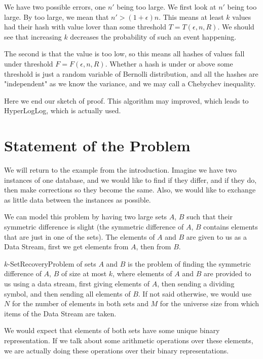 We have two possible errors, one $n'$ being too large. We first look at $n'$ being too large. By too large, we mean that $n' > (1 + \epsilon) n$. This means at least $k$ values had their hash with value lover than some threshold $T = T(\epsilon, n, R)$. We should see that increasing $k$ decreases the probability of such an event happening. 

The second is that the value is too low, so this means all hashes of values fall under threshold $F=F(\epsilon, n, R)$. Whether a hash is under or above some threshold is just a random variable of Bernolli distribution, and all the hashes are "independent" as we know the variance, and we may call a Chebychev inequality.

Here we end our sketch of proof. This algorithm may improved, which leads to HyperLogLog, which is actually used.



\section{Statement of the Problem}

We will return to the example from the introduction. Imagine we have two instances of one database, and we would like to find if they differ, and if they do, then make corrections so they become the same. Also, we would like to exchange as little data between the instances as possible.

We can model this problem by having two large sets \(A\), \(B\) such that their symmetric difference is slight (the symmetric difference of \(A\), \(B\) contains elements that are just in one of the sets). The elements of \(A\) and \(B\) are given to us as a Data Stream, first we get elements from \(A\), then from \(B\).

\begin{defn}
    \(k\)-SetRecoveryProblem of sets \(A\) and \(B\) is the problem of finding the symmetric difference of \(A\), \(B\) of size at most \(k\), where elements of \(A\) and \(B\) are provided to us using a data stream, first giving elements of \(A\), then sending a dividing symbol, and then sending all elements of \(B\). If not said otherwise, we would use \(N\) for the number of elements in both sets and \(M\) for the universe size from which items of the Data Stream are taken.
\end{defn}

We would expect that elements of both sets have some unique binary representation. If we talk about some arithmetic operations over these elements, we are actually doing these operations over their binary representations.

